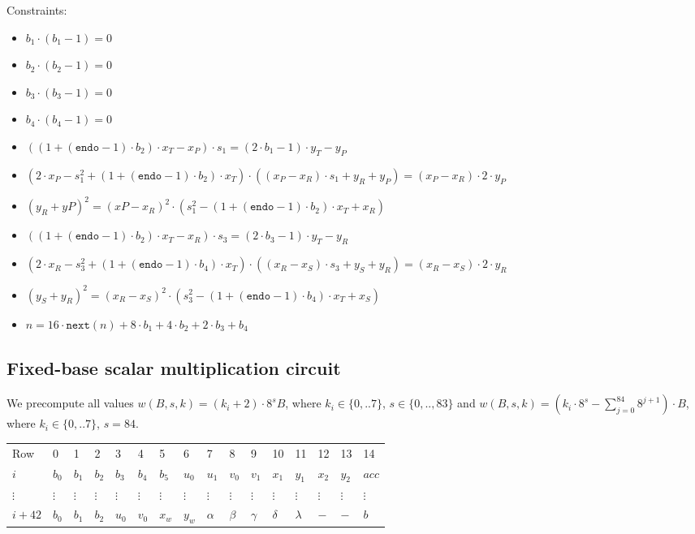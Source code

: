 Constraints:
\begin{itemize}
    \item $b_1 \cdot (b_1 - 1) = 0$
    \item $b_2 \cdot (b_2 - 1) = 0$
    \item $b_3 \cdot (b_3 - 1) = 0$
    \item $b_4 \cdot (b_4 - 1) = 0$
    \item $((1 + (\texttt{endo} - 1) \cdot b_2) \cdot x_T - x_P) \cdot s_1 = (2 \cdot b_1 - 1) \cdot y_T - y_P$
    \item $(2 \cdot x_P - s_1^2 + (1 + (\texttt{endo} - 1) \cdot b_2) \cdot x_T) \cdot ((x_P - x_R) \cdot s_1 + y_R + y_P) = (x_P - x_R) \cdot 2 \cdot y_P$
    \item $(y_R + yP)^2 = (xP - x_R)^2 \cdot (s_1^2 - (1 + (\texttt{endo} - 1) \cdot b_2) \cdot x_T + x_R)$
    \item $((1 + (\texttt{endo} - 1) \cdot b_2) \cdot x_T - x_R) \cdot s_3 = (2 \cdot b_3-1) \cdot y_T - y_R$
    \item $(2 \cdot x_R - s_3^2 + (1 + (\texttt{endo} - 1) \cdot b_4) \cdot x_T) \cdot ((x_R - x_S) \cdot s_3 + y_S + y_R) = (x_R - x_S) \cdot 2 \cdot y_R$
    \item $(y_S + y_R)^2 = (x_R - x_S)^2 \cdot (s_3^2 - (1 + (\texttt{endo} - 1) \cdot b_4) \cdot x_T + x_S)$
    \item $n = 16 \cdot \texttt{next}(n) + 8 \cdot b_1 + 4 \cdot b_2 + 2 \cdot b_3 + b_4$
\end{itemize}

\subsection{Fixed-base scalar multiplication circuit}
We precompute all values $w(B,s,k) = (k_i + 2) \cdot 8^s B$, where $k_i \in \{ 0,..7 \}$, $s \in \{0,.., 83\}$ and  $w(B,s,k) = (k_i \cdot 8^s - \sum_{j = 0}^{84} 8^{j + 1}) \cdot B$, where $k_i \in \{ 0,..7 \}$, $s = 84$.
\begin{center}
    \begin{table}[H]
        \begin{tabular}{llllllllllllllll}
            Row        & 0        & 1        & 2        & 3        & 4        & 5        & 6        & 7        & 8        & 9        & 10       & 11        & 12       & 13       & 14       \\
            $i$      & $b_0$    & $b_1$    & $b_2$    & $b_3$    & $b_4$    & $b_5$    & $u_0$    & $u_1$    & $v_0$    & $v_1$    & $x_1$    & $y_1$     & $x_2$ & $y_2$ & $acc$ \\
            $\vdots$  & $\vdots$ & $\vdots$ & $\vdots$ & $\vdots$ & $\vdots$ & $\vdots$ & $\vdots$ & $\vdots$ & $\vdots$ & $\vdots$ & $\vdots$ & $\vdots$ & $\vdots$ & $\vdots$ & $\vdots$ \\
            $i + 42$ & $b_0$    & $b_1$    & $b_2$    & $u_0$    & $v_0$    & $x_w$    & $y_w$    & $\alpha$ & $\beta$  & $\gamma$ & $\delta$ & $\lambda$ & $-$ & $-$ & $b$ \\
        \end{tabular}
    \end{table}
\end{center}

